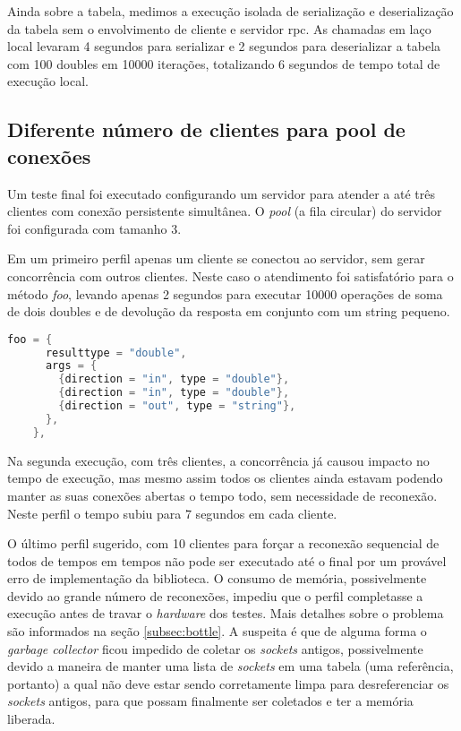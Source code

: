 \documentclass[11pt]{article}
\begin{document}
Ainda sobre a tabela, medimos a execução isolada de serialização e
deserialização da tabela sem o envolvimento de cliente e servidor \gls{rpc}. As
chamadas em laço local levaram 4 segundos para serializar e 2 segundos para
deserializar a tabela com 100 doubles em 10000 iterações, totalizando 6 segundos
de tempo total de execução local.

\subsection{Diferente número de clientes para pool de conexões}\label{subsec:diffpool}

Um teste final foi executado configurando um servidor para atender a até três
clientes com conexão persistente simultânea. O \textit{pool} (a fila circular)
do servidor foi configurada com tamanho 3.

Em um primeiro perfil apenas um cliente se conectou ao servidor, sem gerar
concorrência com outros clientes. Neste caso o atendimento foi satisfatório para
o método \textit{foo}, levando apenas 2 segundos para executar 10000 operações
de soma de dois doubles e de devolução da resposta em conjunto com um string
pequeno.

\begin{lstlisting}[label={ifacefoo},language=C,caption=Interface foo]
    foo = {
      resulttype = "double",
      args = {
        {direction = "in", type = "double"},
        {direction = "in", type = "double"},
        {direction = "out", type = "string"},
      },
    },
\end{lstlisting}

Na segunda execução, com três clientes, a concorrência já causou impacto no
tempo de execução, mas mesmo assim todos os clientes ainda estavam podendo
manter as suas conexões abertas o tempo todo, sem necessidade de reconexão.
Neste perfil o tempo subiu para 7 segundos em cada cliente.

O último perfil sugerido, com 10 clientes para forçar a reconexão sequencial de
todos de tempos em tempos não pode ser executado até o final por um provável
erro de implementação da biblioteca. O consumo de memória, possivelmente devido
ao grande número de reconexões, impediu que o perfil completasse a execução
antes de travar o \textit{hardware} dos testes. Mais detalhes sobre o problema
são informados na seção \ref{subsec:bottle}. A suspeita é que de alguma forma o
\textit{garbage collector} ficou impedido de coletar os \textit{sockets}
antigos, possivelmente devido a maneira de manter uma lista de \textit{sockets}
em uma tabela (uma referência, portanto) a qual não deve estar sendo
corretamente limpa para desreferenciar os \textit{sockets} antigos, para que
possam finalmente ser coletados e ter a memória liberada.
\end{document}
